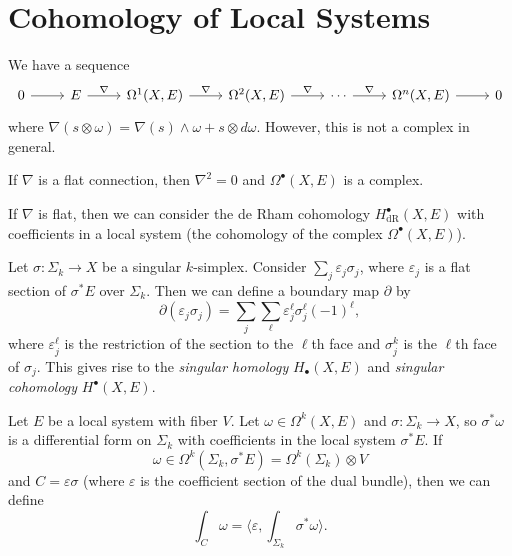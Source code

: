 \section{Cohomology of Local Systems}

\begin{remark}
  We have a sequence
  \[
    \begin{tikzcd}
      0 \ar[r] & E \ar[r, "\nabla"] & \Omega^1(X, E) \ar[r, "\nabla"] & \Omega^2(X, E) \ar[r, "\nabla"] & \cdots \ar[r, "\nabla"]
               & \Omega^n(X, E) \ar[r] & 0
    \end{tikzcd}
  \]
  where $\nabla(s \otimes \omega) = \nabla(s) \wedge \omega + s \otimes d\omega$.
  However, this is not a complex in general.
\end{remark}

\begin{prop}
  If $\nabla$ is a flat connection, then
  $\nabla^2 = 0$ and
  $\Omega^\bullet(X, E)$ is a complex.
\end{prop}

\begin{remark}
  If $\nabla$ is flat, then we
  can consider the de Rham cohomology
  $H^\bullet_{\mathrm{dR}}(X, E)$
  with coefficients in a local system
  (the cohomology of the
  complex $\Omega^\bullet(X, E)$).
\end{remark}

\begin{remark}
  Let $\sigma : \Sigma_k \to X$ be a
  singular $k$-simplex. Consider
  $\sum_j \varepsilon_j \sigma_j$, where
  $\varepsilon_j$ is a flat section 
  of $\sigma^* E$ over $\Sigma_k$. Then
  we can define a boundary map $\partial$ by
  \[
    \partial (\varepsilon_j \sigma_j)
    = \sum_j \sum_\ell \varepsilon_j^\ell \sigma_j^\ell (-1)^\ell,
  \]
  where $\varepsilon_j^\ell$ is the restriction
  of the section to the $\ell$th face and
  $\sigma_j^k$ is the $\ell$th face of
  $\sigma_j$. This gives rise to the
  \emph{singular homology}
  $H_\bullet(X, E)$
  and \emph{singular cohomology}
  $H^\bullet(X, E)$.
\end{remark}

\begin{remark}
  Let $E$ be a local system with
  fiber $V$. Let $\omega \in \Omega^k(X, E)$
  and
  $\sigma : \Sigma_k \to X$, so
  $\sigma^* \omega$ is a differential form
  on $\Sigma_k$ with coefficients in the
  local system $\sigma^* E$. If
  \[
    \omega \in \Omega^k(\Sigma_k, \sigma^* E)
    = \Omega^k(\Sigma_k) \otimes V
  \]
  and $C = \varepsilon \sigma$ (where
  $\varepsilon$ is the coefficient section
  of the dual bundle), then we can define
  \[
    \int_C \omega
    = \langle \varepsilon, \int_{\Sigma_k} \sigma^* \omega \rangle.
  \]
\end{remark}

